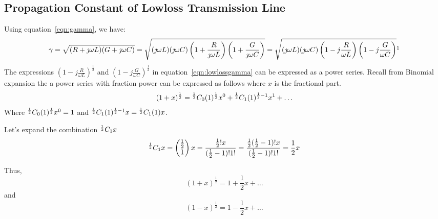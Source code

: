 \subsection{Propagation Constant of Lowloss Transmission Line}
Using equation~\eqref{eqn:gamma}, we have:
\begin{dmath}
\gamma = \sqrt{(R + \jmath\omega L)(G + \jmath\omega C)}
= \sqrt{{(\jmath\omega L)(\jmath\omega C)\left(1 + \frac{R}{\jmath\omega L}\right)\left(1 + \frac{G}{\jmath\omega C}\right)}}
= \sqrt{{(\jmath\omega L)(\jmath\omega C)\left(1 - j\frac{R}{\omega L}\right)\left(1 - j\frac{G}{\omega C}\right)}}\footnotemark
\label{eqn:lowlossgamma}
\end{dmath}
The expressions $\left(1 - j\frac{R}{\omega L}\right)^{\frac{1}{2}}$ and $\left(1 - j\frac{G}{\omega C}\right)^{\frac{1}{2}}$ in equation~\eqref{eqn:lowlossgamma} can be expressed as a power series. Recall from Binomial expansion the a power series with fraction power can be expressed as follows where $x$ is the fractional part.
\begin{dmath*}
(1 + x)^{\frac{1}{2}} = \Comb{\frac{1}{2}}{0}(1)^{\frac{1}{2}}x^0 + \Comb{\frac{1}{2}}{1}(1)^{{\frac{1}{2}} - 1}x^1 + \ldots
\end{dmath*}
Where ${}^{\frac{1}{2}}C_{0}(1)^{\frac{1}{2}}x^0 = 1$ and ${}^{\frac{1}{2}}C_{1}(1)^{\frac{1}{2} - 1}x = {}^{\frac{1}{2}}C_{1}(1)x$.

Let's expand the combination ${}^{\frac{1}{2}}C_{1} x$
\begin{dmath*}
\Comb{\frac{1}{2}}{1} x = \begin{pmatrix}\frac{1}{2}\\1 \end{pmatrix}x = \frac{\frac{1}{2}! x}{(\frac{1}{2} - 1)!1!} = \frac{\frac{1}{2}(\frac{1}{2} - 1)! x}{(\frac{1}{2} - 1)!1!} = \frac{1}{2}x
\end{dmath*}

Thus,
\[(1 + x)^{\frac{1}{2}} = 1 + \frac{1}{2}x + \ldots\]
and
\[(1 - x)^{\frac{1}{2}} = 1 - \frac{1}{2}x + \ldots\]

